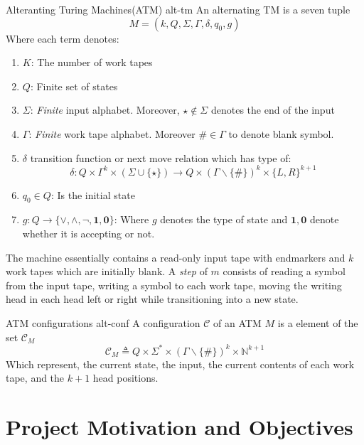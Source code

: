 \begin{definitionbox}{Alteranting Turing Machines(ATM) \cite{kozen_TheoryComputation_2006, chandra1981alternation}}{alt-tm}
    \label{def:alt-tm}
    An alternating TM is a seven tuple
    $$
    M = (k , Q, \Sigma, \Gamma, \delta, q_0, g)
    $$
    Where each term denotes:
    \begin{enumerate}
        \item $K$: The number of work tapes
        \item $Q$: Finite set of states
        \item $\Sigma$: \textit{Finite} input alphabet. Moreover, $\star \not\in \Sigma$ denotes the end of the input
        \item $\Gamma$: \textit{Finite} work tape alphabet. Moreover $\# \in \Gamma$ to denote blank symbol.
        \item $\delta$ transition function or next move relation which has type of:
        $$
        \delta :Q \times \Gamma^k \times (\Sigma \cup \{\star\}) \to 
        Q \times (\Gamma \smallsetminus \{\#\})^k \times \{L, R\}^{k+1}
        $$
        \item $q_0 \in Q$: Is the initial state
        \item $g : Q \to \{\vee, \wedge, \neg , \textbf{1}, \textbf{0}\}$: Where $g$ denotes the type of state
        and $\mathbf{1}, \mathbf{0}$  denote whether it is accepting or not.

    \end{enumerate}

\end{definitionbox}

The machine essentially contains a read-only input tape with endmarkers and $k$ work tapes which are
initially blank. A \textit{step} of $m$ consists of reading a symbol from the input tape,
writing a symbol to each work tape, moving the writing head in each head left or right
while transitioning into a new state.

\begin{definitionbox}{ATM configurations \cite{kozen_TheoryComputation_2006, chandra1981alternation}}{alt-conf}
    \label{def:alt-conf}
    A configuration $\mathcal{C}$ of an ATM $M$ is a element of the set $\mathcal{C}_M$
    $$
    \mathcal{C}_M \triangleq Q \times \Sigma^* \times (\Gamma \smallsetminus \{\#\})^k \times \mathbb{N}^{k+1}
    $$
    Which represent, the current state, the input, the current contents of each work tape, and the $k+1$ head positions.
\end{definitionbox}


\section{Project Motivation and Objectives}